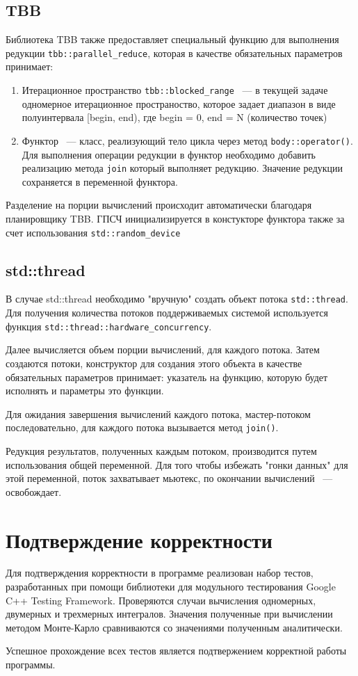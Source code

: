\documentclass{report}
\begin{document}
\subsection*{TBB}
Библиотека TBB также предоставляет специальный функцию для выполнения редукции \verb|tbb::parallel_reduce|, которая в качестве обязательных параметров принимает:
 \begin{enumerate}
\item Итерационное пространство \verb|tbb::blocked_range|  ~--- в текущей задаче одномерное итерационное пространоство, которое задает диапазон в виде
полуинтервала [begin, end), где begin = 0, end = N (количество точек)
\item Функтор ~--- класс, реализующий тело цикла через метод \verb|body::operator()|. Для выполнения операции редукции в функтор необходимо добавить реализацию метода \verb|join| который выполняет редукцию. Значение редукции сохраняется в переменной функтора.
\end{enumerate}
Разделение на порции вычислений происходит автоматически благодаря планировщику TBB. ГПСЧ инициализируется в констукторе функтора также за счет использования \verb|std::random_device|

\subsection*{std::thread}
В случае std::thread необходимо "вручную" создать объект потока \verb|std::thread|. Для получения количества потоков поддерживаемых системой используется функция \verb|std::thread::hardware_concurrency|. \par Далее вычисляется объем порции вычислений, для каждого потока. Затем создаются потоки, конструктор для создания этого объекта в качестве обязательных параметров принимает: указатель на функцию, которую будет исполнять и параметры это функции.
\par Для ожидания завершения вычислений каждого потока, мастер-потоком последовательно, для каждого потока вызывается метод \verb|join()|. 
\par Редукция результатов, полученных каждым потоком, производится путем использования общей переменной. Для того чтобы избежать "гонки данных" для этой переменной, поток захватывает мьютекс, по окончании вычислений ~--- освобождает.
\newpage

\section*{Подтверждение корректности}
Для подтверждения корректности в программе реализован набор тестов, разработанных при помощи библиотеки для модульного тестирования Google C++ Testing Framework. Проверяются случаи вычисления одномерных, двумерных и трехмерных интегралов. Значения полученные при вычислении методом Монте-Карло сравниваются со значениями полученным аналитически.
\par Успешное прохождение всех тестов является подтвержением корректной работы программы. 
\end{document}
